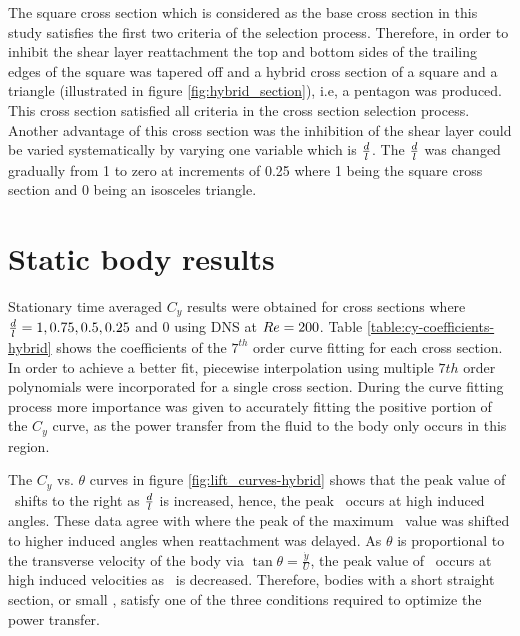 The square cross section which is considered as the base cross section in this study satisfies the first two criteria of the selection process. Therefore, in order to inhibit the shear layer reattachment the top and bottom sides of the trailing edges of the square was tapered off and a hybrid cross section of a square and a triangle (illustrated in figure \ref{fig:hybrid_section}), i.e, a pentagon was produced. This cross section satisfied all criteria in the cross section selection process. Another advantage of this cross section was the inhibition of the shear layer could be varied systematically by varying one variable which is $\frac{d}{l}$. The $\frac{d}{l}$ was changed gradually from 1 to zero at increments of 0.25 where 1 being the square cross section and 0 being an isosceles triangle. 


\section{Static body results}
\label{sec:cross-sec-Static body results}



Stationary time averaged $C_y$ results were obtained for cross sections where $\frac{d}{l}=1,0.75,0.5,0.25$ and $0$ using DNS at $Re=200$. Table \ref{table:cy-coefficients-hybrid} shows the coefficients of the $7^{th}$ order curve fitting for each cross section. In order to achieve a better fit, piecewise interpolation using multiple $7th$ order polynomials were incorporated for a single cross section. During the curve fitting process more importance was given to accurately fitting the positive portion of the $C_{y}$ curve, as the power transfer from the fluid to the body only occurs in this region. 

 

The $C_y$ vs. $\theta$ curves in figure \ref{fig:lift_curves-hybrid} shows that the peak value of \cy\ shifts to the right as $\frac{d}{l}$ is increased, hence, the peak \cy\ occurs at high induced angles.  These data agree with \citet{Luo1994} where the peak of the maximum \cy\ value was shifted to higher induced angles when reattachment was delayed. As $\theta$ is proportional to the transverse velocity of the body via $\tan{\theta}=\frac{\dot{y}}{U}$, the peak value of \cy\ occurs at high induced velocities as \ratio\ is decreased. Therefore, bodies with a short straight section, or small \ratio, satisfy one of the three conditions required to optimize the power transfer.

